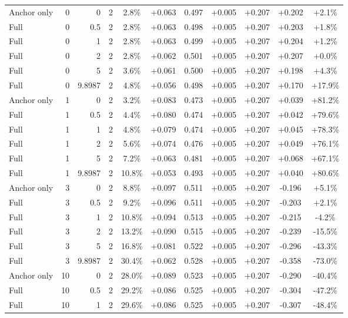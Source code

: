 \begin{table}[htbp]
\begin{tabular}{lrrrccccccc}
Anchor only & 0 & 0 & 2 & 2.8\% & +0.063 & 0.497 & +0.005 & +0.207 & +0.202 & +2.1\% \\
Full & 0 & 0.5 & 2 & 2.8\% & +0.063 & 0.498 & +0.005 & +0.207 & +0.203 & +1.8\% \\
Full & 0 & 1 & 2 & 2.8\% & +0.063 & 0.499 & +0.005 & +0.207 & +0.204 & +1.2\% \\
Full & 0 & 2 & 2 & 2.8\% & +0.062 & 0.501 & +0.005 & +0.207 & +0.207 & +0.0\% \\
Full & 0 & 5 & 2 & 3.6\% & +0.061 & 0.500 & +0.005 & +0.207 & +0.198 & +4.3\% \\
Full & 0 & 9.8987 & 2 & 4.8\% & +0.056 & 0.498 & +0.005 & +0.207 & +0.170 & +17.9\% \\
Anchor only & 1 & 0 & 2 & 3.2\% & +0.083 & 0.473 & +0.005 & +0.207 & +0.039 & +81.2\% \\
Full & 1 & 0.5 & 2 & 4.4\% & +0.080 & 0.474 & +0.005 & +0.207 & +0.042 & +79.6\% \\
Full & 1 & 1 & 2 & 4.8\% & +0.079 & 0.474 & +0.005 & +0.207 & +0.045 & +78.3\% \\
Full & 1 & 2 & 2 & 5.6\% & +0.074 & 0.476 & +0.005 & +0.207 & +0.049 & +76.1\% \\
Full & 1 & 5 & 2 & 7.2\% & +0.063 & 0.481 & +0.005 & +0.207 & +0.068 & +67.1\% \\
Full & 1 & 9.8987 & 2 & 10.8\% & +0.053 & 0.493 & +0.005 & +0.207 & +0.040 & +80.6\% \\
Anchor only & 3 & 0 & 2 & 8.8\% & +0.097 & 0.511 & +0.005 & +0.207 & -0.196 & +5.1\% \\
Full & 3 & 0.5 & 2 & 9.2\% & +0.096 & 0.511 & +0.005 & +0.207 & -0.203 & +2.1\% \\
Full & 3 & 1 & 2 & 10.8\% & +0.094 & 0.513 & +0.005 & +0.207 & -0.215 & -4.2\% \\
Full & 3 & 2 & 2 & 13.2\% & +0.090 & 0.515 & +0.005 & +0.207 & -0.239 & -15.5\% \\
Full & 3 & 5 & 2 & 16.8\% & +0.081 & 0.522 & +0.005 & +0.207 & -0.296 & -43.3\% \\
Full & 3 & 9.8987 & 2 & 30.4\% & +0.062 & 0.528 & +0.005 & +0.207 & -0.358 & -73.0\% \\
Anchor only & 10 & 0 & 2 & 28.0\% & +0.089 & 0.523 & +0.005 & +0.207 & -0.290 & -40.4\% \\
Full & 10 & 0.5 & 2 & 29.2\% & +0.086 & 0.525 & +0.005 & +0.207 & -0.304 & -47.2\% \\
Full & 10 & 1 & 2 & 29.6\% & +0.086 & 0.525 & +0.005 & +0.207 & -0.307 & -48.4\% \\

\end{tabular}
\end{table}
